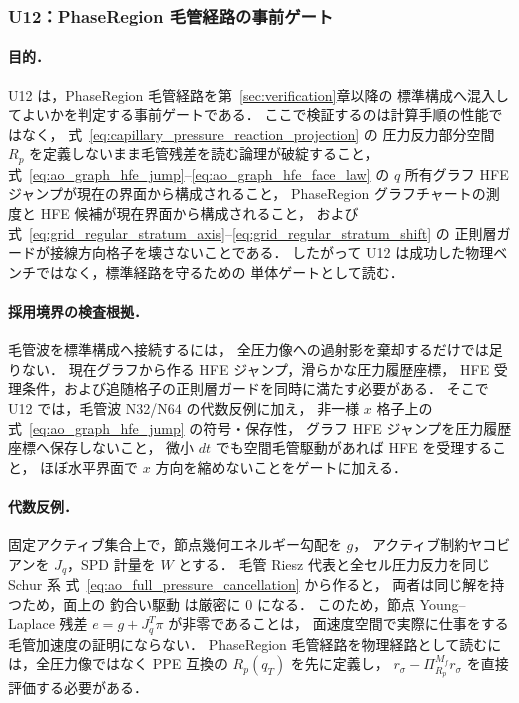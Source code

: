 %
\subsubsection{U12：PhaseRegion 毛管経路の事前ゲート}
\label{sec:U12_ao_capillary_split_gate}

\paragraph{目的．}
U12 は，PhaseRegion 毛管経路を第~\ref{sec:verification}章以降の
標準構成へ混入してよいかを判定する事前ゲートである．
ここで検証するのは計算手順の性能ではなく，
式~\eqref{eq:capillary_pressure_reaction_projection} の
圧力反力部分空間 $R_p$ を定義しないまま毛管残差を読む論理が破綻すること，
式~\eqref{eq:ao_graph_hfe_jump}--\eqref{eq:ao_graph_hfe_face_law} の
$q$ 所有グラフ HFE ジャンプが現在の界面から構成されること，
PhaseRegion グラフチャートの測度と HFE 候補が現在界面から構成されること，
および式~\eqref{eq:grid_regular_stratum_axis}--\eqref{eq:grid_regular_stratum_shift} の
正則層ガードが接線方向格子を壊さないことである．
したがって U12 は成功した物理ベンチではなく，標準経路を守るための
単体ゲートとして読む．

\paragraph{採用境界の検査根拠．}
毛管波を標準構成へ接続するには，
全圧力像への過射影を棄却するだけでは足りない．
現在グラフから作る HFE ジャンプ，滑らかな圧力履歴座標，
HFE 受理条件，および追随格子の正則層ガードを同時に満たす必要がある．
そこで U12 では，毛管波 N32/N64 の代数反例に加え，
非一様 $x$ 格子上の式~\eqref{eq:ao_graph_hfe_jump} の符号・保存性，
グラフ HFE ジャンプを圧力履歴座標へ保存しないこと，
微小 $dt$ でも空間毛管駆動があれば HFE を受理すること，
ほぼ水平界面で $x$ 方向を縮めないことをゲートに加える．

\paragraph{代数反例．}
固定アクティブ集合上で，節点幾何エネルギー勾配を $g$，
アクティブ制約ヤコビアンを $J_q$，SPD 計量を $W$ とする．
毛管 Riesz 代表と全セル圧力反力を同じ Schur 系
式~\eqref{eq:ao_full_pressure_cancellation} から作ると，
両者は同じ解を持つため，面上の 釣合い駆動 は厳密に $0$ になる．
このため，節点 Young--Laplace 残差 $e=g+J_q^T\pi$ が非零であることは，
面速度空間で実際に仕事をする毛管加速度の証明にならない．
PhaseRegion 毛管経路を物理経路として読むには，全圧力像ではなく
PPE 互換の $R_p(q_T)$ を先に定義し，
$r_\sigma-\Pi^{M_f}_{R_p}r_\sigma$ を直接評価する必要がある．

